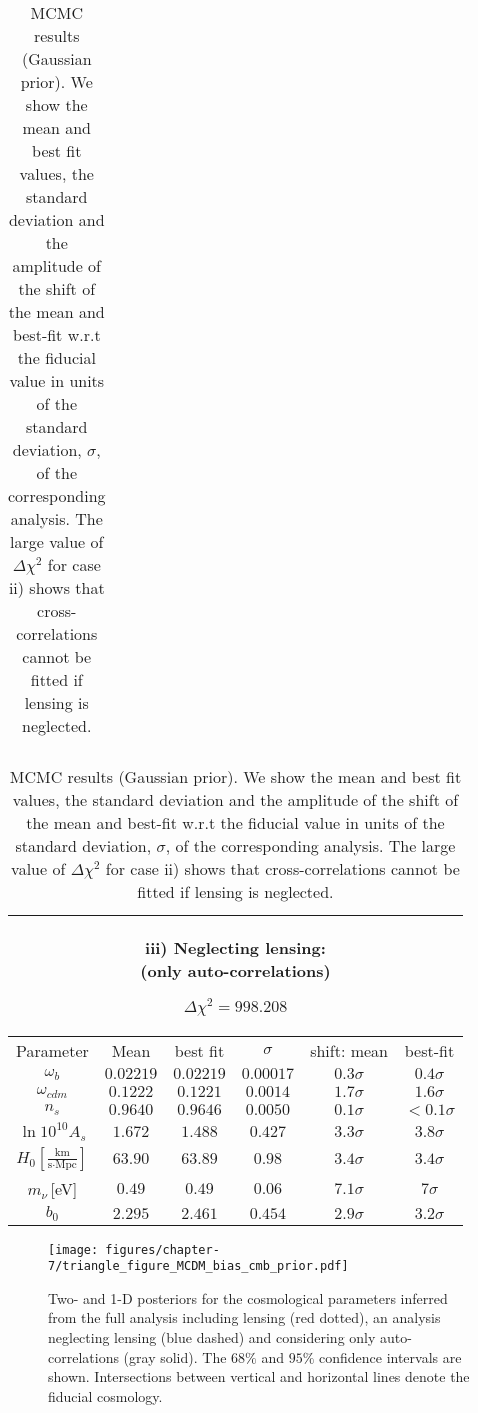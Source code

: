 \begin{table}[!t]
\begin{tabular}{@{}cccccc}
\end{tabular}
\begin{tabular}{@{}cccccc}
\hline
\multicolumn{6}{c}{\parbox[t]{4.4cm}{iii) Neglecting lensing: \\ \hspace*{0.9cm} (only auto-correlations)} $\Delta \chi^2 = 998.208$} \\
\hline
Parameter & Mean & best fit & $\sigma$ & \hspace{-0.52cm} shift: mean & best-fit\\
\hline
$\omega_b$ & $0.02219 $ & $0.02219 $ & $0.00017 $ &  \quad$0.3\sigma$ & $0.4\sigma$ \\
$\omega_{cdm}$ & $0.1222 $ & $0.1221 $ & $0.0014 $ &  \quad$1.7\sigma$ & $1.6\sigma$ \\
$n_s$      & $0.9640 $ & $0.9646 $ & $0.0050 $ &  \quad$0.1\sigma$ & $<0.1\sigma$ \\
$\ln10^{10}A_s$ & $1.672 $ & $1.488 $ & $0.427 $ &  \quad$3.3 \sigma$ & $3.8\sigma$ \\
$H_0\left[\frac{\text{km}}{\text{s}\cdot\text{Mpc}}\right]$      & $63.90 $ & $63.89$ & $0.98$ &  \quad$3.4 \sigma$ & $3.4\sigma$ \\
$m_{\nu}$\,[eV]  & $0.49$ & $0.49$ & $0.06$ &  \quad$7.1\sigma$ & $7\sigma$ \\
$b_0$ & $2.295$ & $2.461$ & $0.454$ & $2.9\sigma$ & $3.2\sigma$ \\
\end{tabular}

\caption{MCMC results (Gaussian prior). We show the mean and best fit values, the standard deviation and the amplitude of the shift of the mean and best-fit w.r.t the fiducial value in units of the standard deviation, $\sigma$, of the corresponding analysis. The large value of $\Delta \chi^2$ for case ii) shows that cross-correlations cannot be fitted if lensing is neglected.
}
\label{Table:mcmc-gaussian-prior}
\end{table}


\begin{figure}[bthp]
\centering
\texttt{[image: figures/chapter-7/triangle\_figure\_MCDM\_bias\_cmb\_prior.pdf]}
\caption{Two- and 1-D posteriors for the cosmological parameters inferred from the full analysis including lensing (red dotted), an analysis neglecting lensing (blue dashed) and considering only auto-correlations (gray solid).
{The $68\%$ and $95\%$ confidence intervals are shown.}
Intersections between vertical and horizontal lines denote the fiducial cosmology.
}
\label{fig:mcmc-cmb-prior}
\end{figure}
